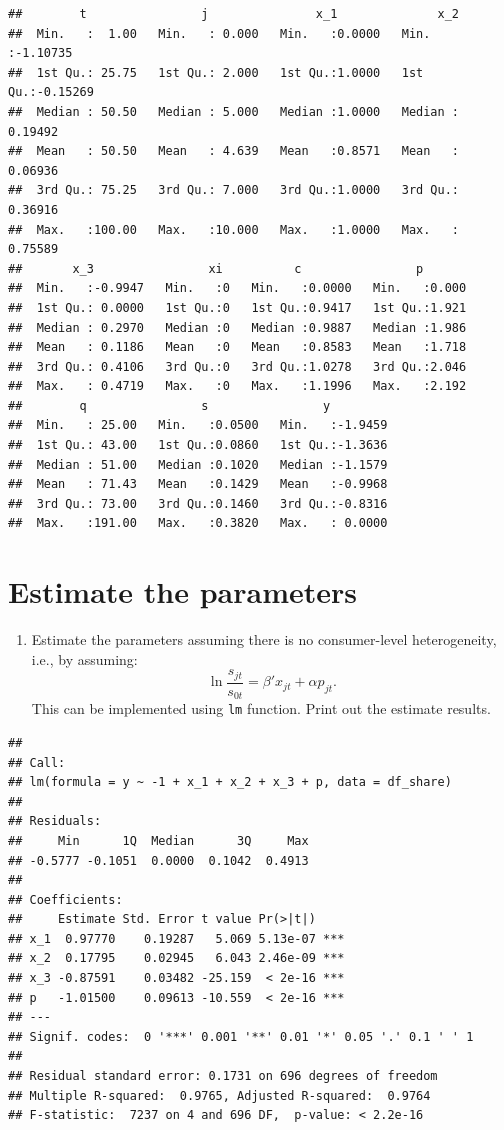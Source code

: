 \documentclass[]{book}
\providecommand{\tightlist}{%
  \setlength{\itemsep}{0pt}\setlength{\parskip}{0pt}}
\begin{document}
\begin{verbatim}
##        t                j               x_1              x_2          
##  Min.   :  1.00   Min.   : 0.000   Min.   :0.0000   Min.   :-1.10735  
##  1st Qu.: 25.75   1st Qu.: 2.000   1st Qu.:1.0000   1st Qu.:-0.15269  
##  Median : 50.50   Median : 5.000   Median :1.0000   Median : 0.19492  
##  Mean   : 50.50   Mean   : 4.639   Mean   :0.8571   Mean   : 0.06936  
##  3rd Qu.: 75.25   3rd Qu.: 7.000   3rd Qu.:1.0000   3rd Qu.: 0.36916  
##  Max.   :100.00   Max.   :10.000   Max.   :1.0000   Max.   : 0.75589  
##       x_3                xi          c                p        
##  Min.   :-0.9947   Min.   :0   Min.   :0.0000   Min.   :0.000  
##  1st Qu.: 0.0000   1st Qu.:0   1st Qu.:0.9417   1st Qu.:1.921  
##  Median : 0.2970   Median :0   Median :0.9887   Median :1.986  
##  Mean   : 0.1186   Mean   :0   Mean   :0.8583   Mean   :1.718  
##  3rd Qu.: 0.4106   3rd Qu.:0   3rd Qu.:1.0278   3rd Qu.:2.046  
##  Max.   : 0.4719   Max.   :0   Max.   :1.1996   Max.   :2.192  
##        q                s                y          
##  Min.   : 25.00   Min.   :0.0500   Min.   :-1.9459  
##  1st Qu.: 43.00   1st Qu.:0.0860   1st Qu.:-1.3636  
##  Median : 51.00   Median :0.1020   Median :-1.1579  
##  Mean   : 71.43   Mean   :0.1429   Mean   :-0.9968  
##  3rd Qu.: 73.00   3rd Qu.:0.1460   3rd Qu.:-0.8316  
##  Max.   :191.00   Max.   :0.3820   Max.   : 0.0000
\end{verbatim}

\section{Estimate the parameters}\label{estimate-the-parameters-1}

\begin{enumerate}
\def\labelenumi{\arabic{enumi}.}
\tightlist
\item
  Estimate the parameters assuming there is no consumer-level
  heterogeneity, i.e., by assuming: \[
  \ln \frac{s_{jt}}{s_{0t}} = \beta' x_{jt} + \alpha p_{jt}.
  \] This can be implemented using \texttt{lm} function. Print out the
  estimate results.
\end{enumerate}

\begin{verbatim}
## 
## Call:
## lm(formula = y ~ -1 + x_1 + x_2 + x_3 + p, data = df_share)
## 
## Residuals:
##     Min      1Q  Median      3Q     Max 
## -0.5777 -0.1051  0.0000  0.1042  0.4913 
## 
## Coefficients:
##     Estimate Std. Error t value Pr(>|t|)    
## x_1  0.97770    0.19287   5.069 5.13e-07 ***
## x_2  0.17795    0.02945   6.043 2.46e-09 ***
## x_3 -0.87591    0.03482 -25.159  < 2e-16 ***
## p   -1.01500    0.09613 -10.559  < 2e-16 ***
## ---
## Signif. codes:  0 '***' 0.001 '**' 0.01 '*' 0.05 '.' 0.1 ' ' 1
## 
## Residual standard error: 0.1731 on 696 degrees of freedom
## Multiple R-squared:  0.9765, Adjusted R-squared:  0.9764 
## F-statistic:  7237 on 4 and 696 DF,  p-value: < 2.2e-16
\end{verbatim}
\end{document}
